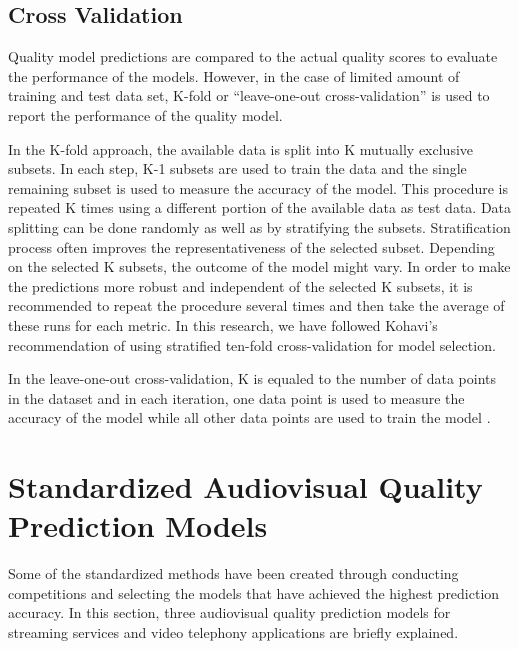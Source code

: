 \documentclass[journal]{IEEEtran}
\begin{document}
\vspace{-0.2cm}
\subsection{Cross Validation}
\label{subsec:CrossVal}

Quality model predictions are compared to the actual quality scores to evaluate the performance of the models. However, in the case of limited amount of training and test data set, K-fold or ``leave-one-out cross-validation'' is used to report the performance of the quality model.

In the K-fold approach, the available data is split into K mutually exclusive subsets. In each step, K-1 subsets are used to train the data and the single remaining subset is used to measure the accuracy of the model. This procedure is repeated K times using a different portion of the available data as test data. Data splitting can be done randomly as well as by stratifying the subsets. Stratification process often improves the representativeness of the selected subset. Depending on the selected K subsets, the outcome of the model might vary. In order to make the predictions more robust and independent of the selected K subsets, it is recommended to repeat the procedure several times and then take the average of these runs for each metric. In this research, we have followed Kohavi's \cite{kohavi1995study} recommendation of using stratified ten-fold cross-validation for model selection.

In the leave-one-out cross-validation, K is equaled to the number of data points in the dataset and in each iteration, one data point is used to measure the accuracy of the model while all other data points are used to train the model \cite{kohavi1995study}.

\vspace{-0.2cm}
\section{Standardized Audiovisual Quality Prediction Models}
\label{sec:Standardized}

Some of the standardized methods have been created through conducting competitions and selecting the models that have achieved the highest prediction accuracy. In this section, three audiovisual quality prediction models for streaming services and video telephony applications are briefly explained.
\end{document}
